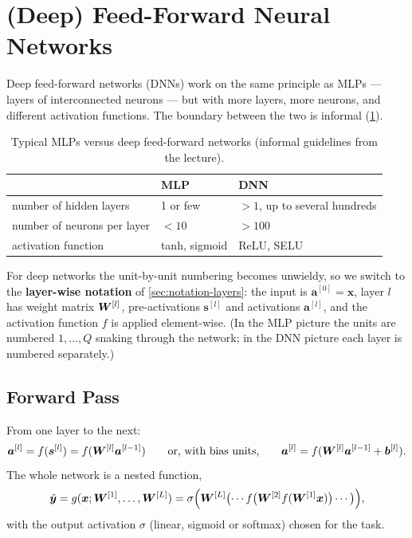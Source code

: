 \documentclass[11pt, oneside]{book}
\newcommand{\bx}{\bm{x}}        \newcommand{\by}{\bm{y}}
\newcommand{\ba}{\bm{a}}        \newcommand{\bs}{\bm{s}}
\newcommand{\bb}{\bm{b}}        \newcommand{\bh}{\bm{h}}
\newcommand{\byhat}{\hat{\bm{y}}}
\newcommand{\lay}[1]{^{[#1]}}            %
\let\originalsection\section
\renewcommand{\section}{\Needspace{7\baselineskip}\originalsection}
\let\originalsubsection\subsection
\renewcommand{\subsection}{\Needspace{6\baselineskip}\originalsubsection}
\begin{document}
\section{(Deep) Feed-Forward Neural Networks}
\label{sec:dnn}

Deep feed-forward networks (DNNs) work on the same principle as MLPs ---
layers of interconnected neurons --- but with more layers, more neurons, and
different activation functions. The boundary between the two is informal
(\cref{tab:mlp-dnn}).

\begin{table}[htbp]
\centering
\small
\begin{tabular}{@{}lll@{}}
\toprule
 & \textbf{MLP} & \textbf{DNN} \\
\midrule
number of hidden layers       & 1 or few        & $> 1$, up to several hundreds \\
number of neurons per layer   & $< 10$          & $> 100$ \\
activation function           & tanh, sigmoid   & ReLU, SELU \\
\bottomrule
\end{tabular}
\caption{Typical MLPs versus deep feed-forward networks (informal
guidelines from the lecture).}
\label{tab:mlp-dnn}
\end{table}

For deep networks the unit-by-unit numbering becomes unwieldy, so we switch
to the \textbf{layer-wise notation} of \cref{sec:notation-layers}: the input
is $\ba\lay{0} = \bx$, layer $l$ has weight matrix $\bW\lay{l}$,
pre-activations $\bs\lay{l}$ and activations $\ba\lay{l}$, and the
activation function $f$ is applied element-wise. (In the MLP picture the
units are numbered $1, \dots, Q$ snaking through the network; in the DNN
picture each layer is numbered separately.)

\subsection{Forward Pass}

From one layer to the next:
\[
  \ba\lay{l} = f(\bs\lay{l}) = f(\bW\lay{l}\ba\lay{l-1})
  \qquad\text{or, with bias units,}\qquad
  \ba\lay{l} = f(\bW\lay{l}\ba\lay{l-1} + \bb\lay{l}).
\]
The whole network is a nested function,
\[
  \byhat = g(\bx; \bW\lay{1}, \dots, \bW\lay{L})
  = \sigma\Bigl(\bW\lay{L}\bigl(\cdots f\bigl(\bW\lay{2} f(\bW\lay{1}\bx)\bigr)\cdots\bigr)\Bigr),
\]
with the output activation $\sigma$ (linear, sigmoid or softmax) chosen
for the task.
\end{document}
